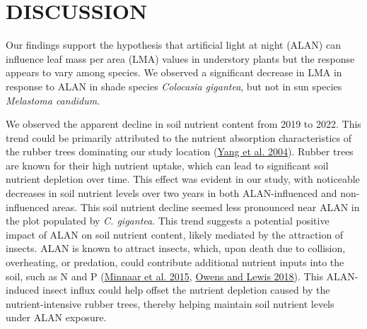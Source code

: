 \documentclass[
  12pt,
  letterpaper,
  DIV=11,
  numbers=noendperiod]{scrartcl}
\begin{document}
\hypertarget{discussion}{%
\section{DISCUSSION}\label{discussion}}

Our findings support the hypothesis that artificial light at night
(ALAN) can influence leaf mass per area (LMA) values in understory
plants but the response appears to vary among species. We observed a
significant decrease in LMA in response to ALAN in shade species
\emph{Colocasia gigantea}, but not in sun species \emph{Melastoma
candidum}.

We observed the apparent decline in soil nutrient content from 2019 to
2022. This trend could be primarily attributed to the nutrient
absorption characteristics of the rubber trees dominating our study
location (\protect\hyperlink{ref-Yang2004}{Yang et al. 2004}). Rubber
trees are known for their high nutrient uptake, which can lead to
significant soil nutrient depletion over time. This effect was evident
in our study, with noticeable decreases in soil nutrient levels over two
years in both ALAN-influenced and non-influenced areas. This soil
nutrient decline seemed less pronounced near ALAN in the plot populated
by \emph{C. gigantea}. This trend suggests a potential positive impact
of ALAN on soil nutrient content, likely mediated by the attraction of
insects. ALAN is known to attract insects, which, upon death due to
collision, overheating, or predation, could contribute additional
nutrient inputs into the soil, such as N and P
(\protect\hyperlink{ref-Minnaar2015}{Minnaar et al. 2015},
\protect\hyperlink{ref-Owens2018}{Owens and Lewis 2018}). This
ALAN-induced insect influx could help offset the nutrient depletion
caused by the nutrient-intensive rubber trees, thereby helping maintain
soil nutrient levels under ALAN exposure.
\end{document}
